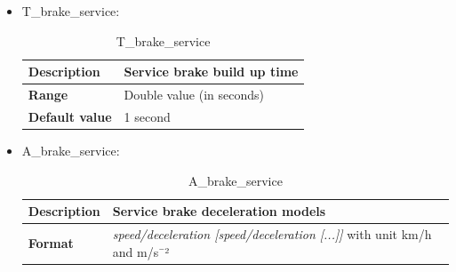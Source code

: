 	\begin{itemize}
		
		\item T\_brake\_service:
		\begin{longtable}{|l|l|}
			\caption{T\_brake\_service}\\
			\hline
			
			\begin{minipage}[t]{0.22\linewidth} \textbf{Description}	\end{minipage}
			&	\begin{minipage}[t]{0.78\linewidth} Service brake build up time \end{minipage} \\
			
			\hline
			
			\begin{minipage}[t]{0.22\linewidth} \textbf{Range}	\end{minipage}
			&	\begin{minipage}[t]{0.78\linewidth} Double value (in seconds) \end{minipage} \\
			
			\hline
			
			\begin{minipage}[t]{0.22\linewidth} \textbf{Default value}	\end{minipage}
			&	\begin{minipage}[t]{0.78\linewidth} 1 second \end{minipage} \\
			
			\hline
		\end{longtable}
		
		\item A\_brake\_service:
		\begin{longtable}{|l|l|}
			\caption{A\_brake\_service}\\
			\hline
			
			\begin{minipage}[t]{0.22\linewidth} \textbf{Description}	\end{minipage}
			&	\begin{minipage}[t]{0.78\linewidth} Service brake deceleration models \end{minipage} \\
			
			\hline
			
			\begin{minipage}[t]{0.22\linewidth} \textbf{Format}	\end{minipage}
			&	\begin{minipage}[t]{0.78\linewidth} \textit{speed/deceleration [speed/deceleration [...]]}  with unit km/h and m/s¯²\end{minipage} \\
			

\end{longtable}
\end{itemize}
